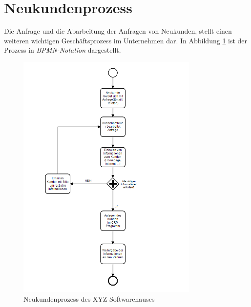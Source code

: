 \section{Neukundenprozess}
Die Anfrage und die Abarbeitung der Anfragen von Neukunden, stellt einen weiteren wichtigen Geschäftsprozess im Unternehmen dar.  In Abbildung \ref{fig:neukunde-process} ist der Prozess in \textit{BPMN-Notation} dargestellt. 

\begin{figure}[ht]
	\centering
		\includegraphics[width=0.80\textwidth]{images/neukunde_prozess.PNG}
	\caption{Neukundenprozess des XYZ Softwarehauses}
	\label{fig:neukunde-process}
\end{figure}

